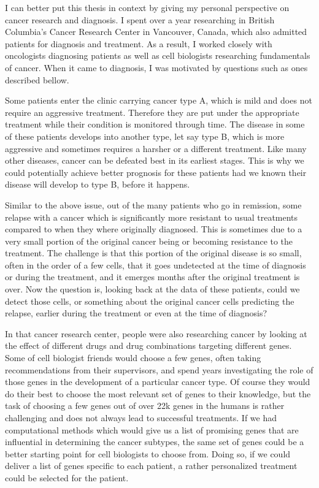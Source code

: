 I can better put this thesis in context by giving my personal perspective on cancer research and diagnosis. I spent over a year researching in British Columbia's Cancer Research Center in Vancouver, Canada, which also admitted patients for diagnosis and treatment. As a result, I worked closely with oncologists diagnosing patients as well as  cell biologists researching fundamentals of cancer. When it came to diagnosis, I was motivated by questions such as ones described bellow.

Some patients enter the clinic carrying cancer type A, which is mild and does not require an aggressive treatment. Therefore they are put under the appropriate treatment while their condition is monitored through time. The disease in some of these patients develops into another type, let say type B, which is more aggressive and sometimes requires a harsher or a different treatment. Like many other diseases, cancer can be defeated best in its earliest stages. This is why we could potentially achieve better prognosis for these patients had we known their disease will develop to type B, before it happens.

Similar to the above issue, out of the many patients who go in remission, some relapse with a cancer which is significantly more resistant to usual treatments compared to when they where originally diagnosed. This is sometimes due to a very small portion of the original cancer being or becoming resistance to the treatment. The challenge is that this portion of the original disease is so small, often in the order of a few cells, that it goes undetected at the time of diagnosis or during the treatment, and it emerges months after the original treatment is over. Now the question is, looking back at the data of these patients, could we detect those cells, or something about the original cancer cells predicting the relapse, earlier during the treatment or even at the time of diagnosis?

In that cancer research center, people were also researching cancer by looking at the effect of different drugs and drug combinations targeting different genes. Some of cell biologist friends would choose a few genes, often taking recommendations from their supervisors, and spend years investigating the role of those genes in the development of a particular cancer type. Of course they would do their best to choose the most relevant set of genes to their knowledge, but the task of choosing a few genes out of over 22k genes in the humans is rather challenging and does not always lead to successful treatments. If we had computational methods which would give us a list of promising genes that are influential in determining the cancer subtypes, the same set of genes could be a better starting point for cell biologists to choose from. Doing so, if we could deliver a list of genes specific to each patient, a rather personalized treatment could be selected for the patient.


